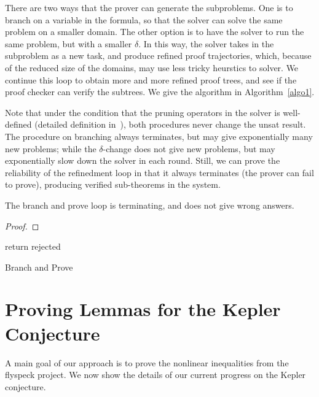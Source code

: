 \documentclass[envcountsect]{llncs}
\begin{document}
There are two ways that the prover can generate the subproblems. One is to
branch on a variable in the formula, so that the solver can solve the same
problem on a smaller domain. The other option is to have the solver to run the
same problem, but with a smaller $\delta$. In this way, the solver takes in the
subproblem as a new task, and produce refined proof trajectories, which,
because of the reduced size of the domains, may use less tricky heurstics to
solver. We continue this loop to obtain more and more refined proof trees, and
see if the proof checker can verify the subtrees. We give the algorithm in
Algorithm~\ref{algo1}. 

\begin{example}
 
\end{example}

Note that under the condition that the pruning operators in the solver is
well-defined (detailed definition in~\cite{}), both procedures never change the
unsat result. The procedure on branching always terminates, but may give
exponentially many new problems; while the $\delta$-change does not give new
problems, but may exponentially slow down the solver in each round. Still, we
can prove the reliability of the refinedment loop in that it always terminates
(the prover can fail to prove), producing verified sub-theorems in the system. 
\begin{proposition}
The branch and prove loop is terminating, and does not give wrong answers. 
\end{proposition}
\begin{proof}
\end{proof}

\begin{algorithm}
\BlankLine
{}
return {\sf rejected}\;
\caption{Branch and Prove\label{algo1}}
\end{algorithm}

\section{Proving Lemmas for the Kepler Conjecture}

A main goal of our approach is to prove the nonlinear inequalities from the
flyspeck project. We now show the details of our current progress on the Kepler
conjecture. 
\end{document}
